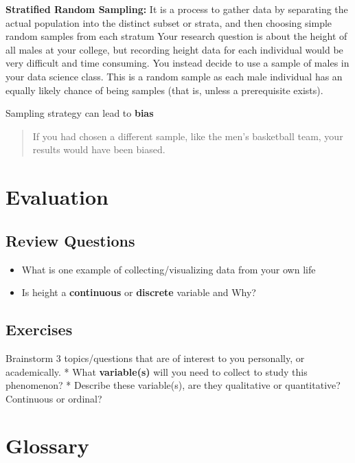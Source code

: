 \documentclass[
]{book}
\providecommand{\tightlist}{%
  \setlength{\itemsep}{0pt}\setlength{\parskip}{0pt}}
\begin{document}
\textbf{Stratified Random Sampling:} It is a process to gather data by
separating the actual population into the distinct subset or
strata, and then choosing simple random samples from each stratum
Your research question is about the height of all males at your
college, but recording height data for each individual would be
very difficult and time consuming. You instead decide to use a
sample of males in your data science class. This is a random
sample as each male individual has an equally likely chance of
being samples (that is, unless a prerequisite exists).

Sampling strategy can lead to \textbf{bias}

\begin{quote}
If you had chosen a different sample, like the men's basketball
team, your results would have been biased.
\end{quote}

\hypertarget{evaluation}{%
\section{Evaluation}\label{evaluation}}

\hypertarget{review-questions}{%
\subsection{Review Questions}\label{review-questions}}

\begin{itemize}
\tightlist
\item
  What is one example of collecting/visualizing data from your own life
\item
  Is height a \textbf{continuous} or \textbf{discrete} variable and Why?
\end{itemize}

\hypertarget{exercises}{%
\subsection{Exercises}\label{exercises}}

Brainstorm 3 topics/questions that are of interest to you personally, or academically.
* What \textbf{variable(s)} will you need to collect to study this phenomenon?
* Describe these variable(s), are they qualitative or quantitative? Continuous or ordinal?

\hypertarget{glossary-1}{%
\section*{Glossary}\label{glossary-1}}
\end{document}
